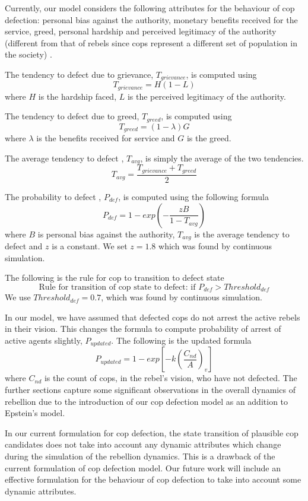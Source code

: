 \documentclass[a4paper,11pt]{article}
\begin{document}
Currently, our model considers the following attributes for the behaviour of cop defection: personal bias against the authority, monetary benefits received for the service, greed, personal hardship and perceived legitimacy of the authority (different from that of rebels since cops represent a different set of population in the society) \cite{epstein2002modeling, policeintegrity, policecorruption, policeattitude}.

The tendency to defect due to grievance, $T_{grievance}$, is computed using
\[T_{grievance} = H (1 - L)\]
where $H$ is the hardship faced, $L$ is the perceived legitimacy of the authority.

The tendency to defect due to greed, $T_{greed}$, is computed using
\[T_{greed} = (1 - \lambda) G\]
where $\lambda$ is the benefits received for service and $G$ is the greed.

The average tendency to defect , $T_{avg}$, is simply the average of the two tendencies.
\[T_{avg} = \frac{T_{grievance} + T_{greed}}{2}\]

The probability to defect , $P_{def}$, is computed using the following formula
\[P_{def} = 1 - exp(-\frac{zB}{1 - T_{avg}})\]
where $B$ is personal bias against the authority, $T_{avg}$ is the average tendency to defect and $z$ is a constant. We set $z=1.8$ which was found by continuous simulation.

The following is the rule for cop to transition to defect state
\[\text{Rule for transition of cop state to defect: if $P_{def} > Threshold_{def}$}\]
We use $Threshold_{def} = 0.7$, which was found by continuous simulation.

In our model, we have assumed that defected cops do not arrest the active rebels in their vision. This changes the formula to compute probability of arrest of active agents slightly, $P_{updated}$. The following is the updated formula
\[ P_{updated} = 1 - exp[-k(\frac{C_{nd}}{A})_v] \]
where $C_{nd}$ is the count of cops, in the rebel's vision, who have not defected. The further sections capture some significant observations in the overall dynamics of rebellion due to the introduction of our cop defection model as an addition to Epstein's model\cite{epstein2002modeling}.

In our current formulation for cop defection, the state transition of plausible cop candidates does not take into account any dynamic attributes which change during the simulation of the rebellion dynamics. This is a drawback of the current formulation of cop defection model. Our future work will include an effective formulation for the behaviour of cop defection to take into account some dynamic attributes.
\\
\end{document}
